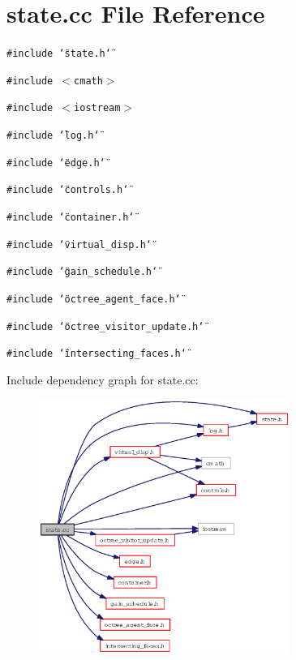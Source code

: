 \section{state.cc File Reference}
\label{state_8cc}
{\tt \#include \char`\"{}state.h\char`\"{}}\par
{\tt \#include $<$cmath$>$}\par
{\tt \#include $<$iostream$>$}\par
{\tt \#include \char`\"{}log.h\char`\"{}}\par
{\tt \#include \char`\"{}edge.h\char`\"{}}\par
{\tt \#include \char`\"{}controls.h\char`\"{}}\par
{\tt \#include \char`\"{}container.h\char`\"{}}\par
{\tt \#include \char`\"{}virtual\_\-disp.h\char`\"{}}\par
{\tt \#include \char`\"{}gain\_\-schedule.h\char`\"{}}\par
{\tt \#include \char`\"{}octree\_\-agent\_\-face.h\char`\"{}}\par
{\tt \#include \char`\"{}octree\_\-visitor\_\-update.h\char`\"{}}\par
{\tt \#include \char`\"{}intersecting\_\-faces.h\char`\"{}}\par


Include dependency graph for state.cc:\begin{figure}[H]
\begin{center}
\leavevmode
\includegraphics[width=232pt]{state_8cc__incl}
\end{center}
\end{figure}

